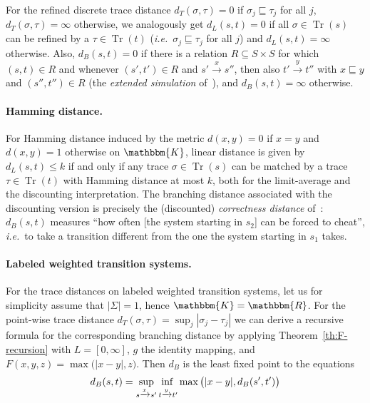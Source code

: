 \documentclass[copyright,creativecommons,sharealike]{eptcs}
\theoremstyle{plain}
\renewcommand*\K{\mathbbm{K}}
\newcommand*\Real{\mathbbm{R}}
\DeclareMathOperator{\Tr}{Tr} \DeclareMathOperator{\Pa}{Pa} \DeclareMathOperator{\fPa}{fPa} \DeclareMathOperator{\tr}{tr} \DeclareMathOperator{\len}{len} \newcommand*\bigmid{\mathrel{\big|}}
\newcommand*\tto[1]{\xrightarrow{#1}}
\newcommand*\ie{\textit{i.e.}}
\begin{document}
For the refined discrete trace distance $d_T( \sigma, \tau)= 0$ if
$\sigma_j\sqsubseteq \tau_j$ for all $j$, $d_T( \sigma, \tau)= \infty$
otherwise, we analogously get $d_L( s, t)= 0$ if all $\sigma\in \Tr(
s)$ can be refined by a $\tau\in \Tr( t)$ (\ie~$\sigma_j\sqsubseteq
\tau_j$ for all $j$) and $d_L( s, t)= \infty$ otherwise.  Also, $d_B(
s, t)= 0$ if there is a relation $R\subseteq S\times S$ for which $(
s, t)\in R$ and whenever $( s', t')\in R$ and $s'\tto x s''$, then
also $t'\tto y t''$ with $x\sqsubseteq y$ and $( s'', t'')\in R$ (the
\emph{extended simulation} of~\cite{Thomsen87}), and $d_B( s, t)=
\infty$ otherwise.

\paragraph{Hamming distance.}

For Hamming distance induced by the metric $d( x, y)= 0$ if $x= y$ and
$d( x, y)= 1$ otherwise on $\K$, linear distance is given by $d_L( s,
t)\le k$ if and only if any trace $\sigma\in \Tr( s)$ can be matched
by a trace $\tau\in \Tr( t)$ with Hamming distance at most $k$, both
for the limit-average and the discounting interpretation.  The
branching distance associated with the discounting version is
precisely the (discounted) \emph{correctness distance}
of~\cite{conf/concur/CernyHR10}: $d_B( s, t)$ measures ``how often
[the system starting in $s_2$] can be forced to cheat'', \ie~to take a
transition different from the one the system starting in $s_1$ takes.

\paragraph{Labeled weighted transition systems.}

For the trace distances on labeled weighted transition systems, let us
for simplicity assume that $| \Sigma|= 1$, hence $\K= \Real$.  For the
point-wise trace distance $d_T( \sigma, \tau)= \sup_j| \sigma_j-
\tau_j|$ we can derive a recursive formula for the corresponding
branching distance by applying Theorem~\ref{th:F-recursion} with $L=[ 0,
\infty]$, $g$ the identity mapping, and $F( x, y, z)=\max\big(| x- y|,
z)$.  Then $d_B$ is the least fixed point to the equations
\begin{equation*}
  d_B( s, t)= \adjustlimits \sup_{ s\tto x s'} \inf_{ t\tto y
    t'} \max\big(| x- y|, d_B( s', t')\big)
\end{equation*}
\end{document}
